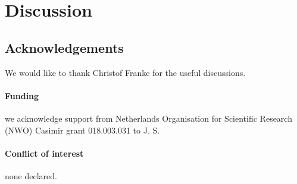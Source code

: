 \documentclass{bioinfo}
\begin{document}
\section{Discussion}


\subsection*{Acknowledgements}
We would like to thank Christof Franke for the useful discussions.
\paragraph*{Funding\textcolon} we acknowledge support from Netherlands Organisation for Scientific Research (NWO) Casimir grant 018.003.031 to J. S.
\paragraph*{Conflict of interest\textcolon} none declared.
\end{document}

